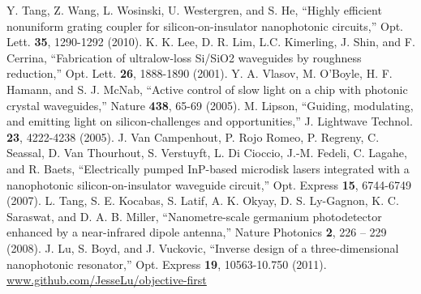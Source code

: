 \documentclass[letterpaper,10pt]{article}
\begin{document}
\begin{thebibliography}{99}
 Y. Tang, Z. Wang, L. Wosinski, U. Westergren, and S. He,
    ``Highly efficient nonuniform grating coupler for silicon-on-insulator 
    nanophotonic circuits,''
    Opt. Lett. \textbf{35}, 1290-1292 (2010).
  K. K. Lee, D. R. Lim, L.C. Kimerling, J. Shin, and F. Cerrina, 
    ``Fabrication of ultralow-loss Si/SiO2 waveguides by roughness reduction,''
    Opt. Lett. \textbf{26}, 1888-1890 (2001).
 Y. A. Vlasov, M. O'Boyle, H. F. Hamann, and S. J. McNab,
    ``Active control of slow light on a chip with photonic crystal waveguides,''
    Nature \textbf{438}, 65-69 (2005).
 M. Lipson, 
    ``Guiding, modulating, and emitting light on 
    silicon-challenges and opportunities,'' 
    J. Lightwave Technol. \textbf{23}, 4222-4238 (2005).
 J. Van Campenhout, P. Rojo Romeo, P. Regreny, C. Seassal, 
    D. Van Thourhout, S. Verstuyft, L. Di Cioccio, J.-M. Fedeli, 
    C. Lagahe, and R. Baets, 
    ``Electrically pumped InP-based microdisk lasers integrated with a 
    nanophotonic silicon-on-insulator waveguide circuit,'' 
    Opt. Express \textbf{15}, 6744-6749 (2007).
 L. Tang, S. E. Kocabas, S. Latif, A. K. Okyay, 
    D. S. Ly-Gagnon, K. C. Saraswat, and D. A. B. Miller, 
    ``Nanometre-scale germanium photodetector enhanced by a 
    near-infrared dipole antenna,'' 
    Nature Photonics \textbf{2}, 226 – 229 (2008).
 J. Lu, S. Boyd, and J. Vuckovic, 
    ``Inverse design of a three-dimensional nanophotonic resonator,''
    Opt. Express \textbf{19}, 10563-10.750 (2011). 
 \url{www.github.com/JesseLu/objective-first}
\end{thebibliography}
\end{document}
